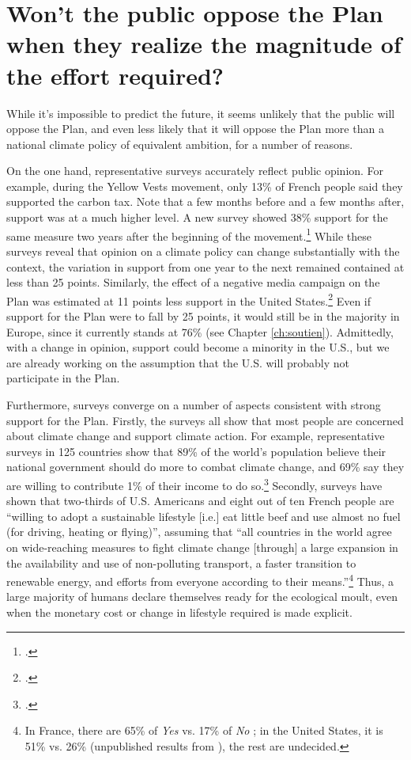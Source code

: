 \documentclass[a5paper,english,openany]{memoir}
\begin{document}
\section*{\normalsize Won't the public oppose the Plan when they realize the magnitude of the effort required?}\label{q:soutien}

While it's impossible to predict the future, it seems unlikely that the public will oppose the Plan, and even less likely that it will oppose the Plan more than a national climate policy of equivalent ambition, for a number of reasons. 

On the one hand, representative surveys accurately reflect public opinion. 
For example, during the Yellow Vests movement, 
only 13\% of French people said they supported the carbon tax. Note that a few months before and a few months after, support was at a much higher level. A new survey showed 38\% support for the same measure two years after the beginning of the movement.\footnote{\citet{douenne_les_2020}.} While these surveys reveal that opinion on a climate policy can change substantially with the context, the variation in support from one year to the next remained contained at less than 25 points. Similarly, the effect of a negative media campaign on the Plan was estimated at 11 points less support 
in the United States.\footnote{\citet{fabre_international_2023}.} Even if support for the Plan were to fall by 25 points, it would still be in the majority in Europe, since it currently stands at 76\% (see Chapter \ref{ch:soutien}). Admittedly, with a change in opinion, support could become a minority in the U.S., but we are already working on the assumption that the U.S. will probably not participate in the Plan. 

Furthermore, surveys converge on a number of aspects consistent with strong support for the Plan. Firstly, the surveys all show that most people are concerned about climate change and support climate action. For example, representative surveys in 125 countries show that 89\% of the world's population believe their national government should do more to combat climate change, and 69\% say they are willing to contribute 1\% of their income to do so.\footnote{\citet{andre_globally_2024}.} %
Secondly, surveys have shown that two-thirds of U.S. Americans and eight out of ten French people are ``willing to adopt a sustainable lifestyle [i.e.] eat little beef and use almost no fuel (for driving, heating or flying)'', assuming that ``all countries in the world agree on wide-reaching measures to fight climate change [through] a large expansion in the availability and use of non-polluting transport, a faster transition to renewable energy, and efforts from everyone according to their means.''\footnote{In France, there are 65\% of \textit{Yes} vs. 17\% of \textit{No} \citep{douenne_french_2020}; in the United States, it is 51\% vs. 26\% (unpublished results from \citealp{dechezlepretre_fighting_2022}), the rest are undecided.} %
Thus, a large majority of humans declare themselves ready for the ecological moult, even when the monetary cost or change in lifestyle required is made explicit. 
\end{document}
